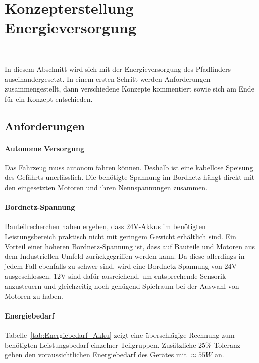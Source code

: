 \documentclass[main.tex]{subfiles} %
\begin{document}

\section{Konzepterstellung Energieversorgung}~\label{appendix:Bordnetz}

In diesem Abschnitt wird sich mit der Energieversorgung des Pfadfinders
auseinandergesetzt. In einem ersten Schritt werden Anforderungen
zusammengestellt, dann verschiedene Konzepte kommentiert sowie sich am Ende für
ein Konzept entschieden.

\subsection*{Anforderungen}

\paragraph{Autonome Versorgung}
Das Fahrzeug muss autonom fahren können. Deshalb ist eine kabellose Speisung
des Gefährts unerlässlich. Die benötigte Spannung im Bordnetz hängt direkt mit
den eingesetzten Motoren und ihren Nennspannungen zusammen.

\paragraph{Bordnetz-Spannung}
Bauteilrecherchen haben ergeben, dass 24V-Akkus im benötigten Leistungsbereich
praktisch nicht mit geringem Gewicht erhältlich sind. Ein Vorteil einer höheren
Bordnetz-Spannung ist, dass auf Bauteile und Motoren aus dem Industriellen
Umfeld zurückgegriffen werden kann. Da diese allerdings in jedem Fall ebenfalls
zu schwer sind, wird eine Bordnetz-Spannung von 24V ausgeschlossen. 12V sind
dafür ausreichend, um entsprechende Sensorik anzusteuern und gleichzeitig noch
genügend Spielraum bei der Auswahl von Motoren zu haben.

\paragraph{Energiebedarf}
Tabelle~\ref{tab:Energiebedarf_Akku} zeigt eine überschlägige Rechnung zum
benötigten Leistungsbedarf einzelner Teilgruppen. Zusätzliche 25\% Toleranz
geben den voraussichtlichen Energiebedarf des Gerätes mit $\approx 55W$ an.
\end{document}
